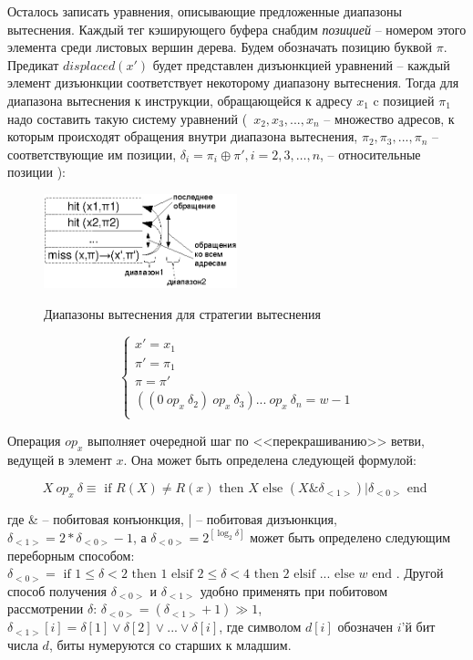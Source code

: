Осталось записать уравнения, описывающие предложенные диапазоны
вытеснения. Каждый тег кэширующего буфера снабдим \emph{позицией} --
номером этого элемента среди листовых вершин дерева. Будем
обозначать позицию буквой $\pi$. Предикат $displaced(x')$ будет
представлен дизъюнкцией уравнений -- каждый элемент дизъюнкции
соответствует некоторому диапазону вытеснения. Тогда для диапазона
вытеснения к инструкции, обращающейся к адресу $x_1$ c позицией
$\pi_1$ надо составить такую систему уравнений (~$x_2, x_3, ...,
x_n$ -- множество адресов, к которым происходят обращения внутри
диапазона вытеснения, $\pi_2, \pi_3, ..., \pi_n$ -- соответствующие
им позиции, $\delta_i = \pi_i \oplus \pi', i = 2,3,\dots,n$, --
относительные позиции ):

\begin{figure}[h] \center
  \includegraphics[width=0.5\textwidth]{2.theor/plru-ranges}\\
  \caption{Диапазоны вытеснения для стратегии вытеснения \PseudoLRU}
\end{figure}

$$
\left\{
\begin{array}{l}
x' = x_1\\
\pi' = \pi_1\\
\pi = \pi'\\
((0~op_x~\delta_2)~op_x~\delta_3) ... ~op_x~\delta_n  = w-1\\
\end{array}
\right.
$$

Операция $op_x$ выполняет очередной шаг по <<перекрашиванию>> ветви,
ведущей в элемент $x$. Она может быть определена следующей формулой:

$$X~op_x~\delta \equiv \mbox{~if~} R(X) \neq R(x) \mbox{~then~} X \mbox{~else~} (X \&
\delta_{<1>}) | \delta_{<0>} \mbox{~end~}$$

где \& -- побитовая конъюнкция, | -- побитовая дизъюнкция,
$\delta_{<1>} = 2 * \delta_{<0>} - 1$, а $\delta_{<0>} = 2^{[\log_2
\delta]}$ может быть определено следующим переборным способом:
$\delta_{<0>} = \mbox{~if~} 1 \leqslant \delta < 2 \mbox{~then~} 1
\mbox{~elsif~} 2 \leqslant \delta < 4 \mbox{~then~} 2 \mbox{~elsif~}
... \mbox{~else~} w \mbox{~end~}$. Другой способ получения
$\delta_{<0>}$ и $\delta_{<1>}$ удобно применять при побитовом
рассмотрении $\delta$: $\delta_{<0>} = (\delta_{<1>} + 1) \gg 1$,
$\delta_{<1>}[i] = \delta[1] \vee \delta[2] \vee ... \vee
\delta[i]$, где символом $d[i]$ обозначен $i$'й бит числа $d$, биты
нумеруются со старших к младшим.


